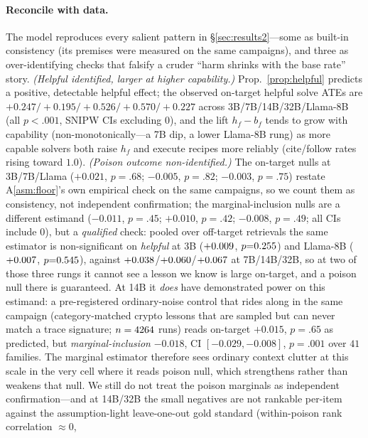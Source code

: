 \paragraph{Reconcile with data.} The model reproduces every salient pattern in
\S\ref{sec:results2}---some as built-in consistency (its premises were measured on the
same campaigns), and three as over-identifying checks that falsify a cruder ``harm
shrinks with the base rate'' story. \emph{(Helpful identified, larger at higher capability.)}
Prop.~\ref{prop:helpful} predicts a positive, detectable helpful effect; the observed
on-target helpful solve ATEs are $+0.247/{+}0.195/{+}0.526/{+}0.570/{+}0.227$ across
3B/7B/14B/32B/Llama-8B (all $p<.001$, SNIPW CIs excluding $0$), and the lift $h_f-b_f$
tends to grow with capability (non-monotonically---a 7B dip, a lower Llama-8B rung) as
more capable solvers both raise $h_f$ and execute recipes more reliably (cite/follow
rates rising toward $1.0$). \emph{(Poison outcome non-identified.)}
The on-target nulls at 3B/7B/Llama
($+0.021$, $p{=}.68$; $-0.005$, $p{=}.82$; $-0.003$, $p{=}.75$) restate
A\ref{asm:floor}'s own empirical check on the same campaigns, so we count them as
consistency, not independent confirmation; the marginal-inclusion nulls are a
different estimand ($-0.011$, $p{=}.45$; $+0.010$, $p{=}.42$; $-0.008$, $p{=}.49$; all
CIs include $0$), but a \emph{qualified} check: pooled over
off-target retrievals the same estimator is non-significant on \emph{helpful} at 3B
($+0.009{}$, $p{=}0.255{}$) and Llama-8B
($+0.007{}$, $p{=}0.545{}$), against
$+0.038{}$/$+0.060{}$/$+0.067{}$ at
7B/14B/32B, so at two of those three rungs it cannot see a lesson we know is large
on-target, and a poison null
there is guaranteed. At 14B it \emph{does} have demonstrated power on this estimand: a
pre-registered ordinary-noise control that rides along in the same campaign
(category-matched crypto lessons that are sampled but can never match a trace signature;
$n=4264$ runs) reads on-target $+0.015$, $p{=}.65$ as predicted, but
\emph{marginal-inclusion} $-0.018$, CI $[-0.029,-0.008]$, $p{=}.001$ over $41$ families.
The marginal estimator therefore sees ordinary context clutter at this scale in the very
cell where it reads poison null, which strengthens rather than weakens that null. We still
do not treat the poison marginals as independent confirmation---and at 14B/32B the small negatives are not rankable per-item against the
assumption-light leave-one-out gold standard (within-poison rank correlation $\approx0$,
